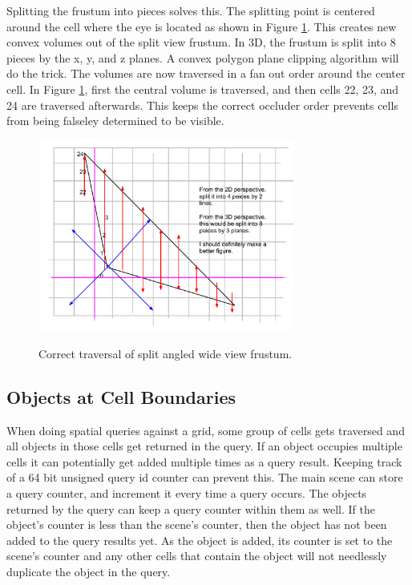 \documentclass[12pt]{ucthesis}
\newcommand{\captionfonts}{\small\bf\ssp}
\begin{document}
Splitting the frustum into pieces solves this.
The splitting point is centered around the cell where the eye is located as shown in Figure \ref{fig:correct-wide-frustum-iter}.
This creates new convex volumes out of the split view frustum.
In 3D, the frustum is split into 8 pieces by the x, y, and z planes.
A convex polygon plane clipping algorithm will do the trick.
The volumes are now traversed in a fan out order around the center cell.
In Figure \ref{fig:correct-wide-frustum-iter}, first the central volume is traversed, and then cells 22, 23, and 24 are traversed afterwards.
This keeps the correct occluder order prevents cells from being falseley determined to be visible.

\begin{figure}
\begin{center}
\includegraphics[width=0.75\textwidth]{Images/wide-traversal.pdf}
\captionfonts
\caption[Correct Wide View Frustum]{Correct traversal of split angled wide view frustum.}
\label{fig:correct-wide-frustum-iter}
\end{center}
\end{figure}

\subsection{Objects at Cell Boundaries}
\label{objects-at-cell-boundaries}
When doing spatial queries against a grid, some group of cells gets traversed and all objects in those cells get returned in the query.
If an object occupies multiple cells it can potentially get added multiple times as a query result.
Keeping track of a 64 bit unsigned query id counter can prevent this.
The main scene can store a query counter, and increment it every time a query occurs.
The objects returned by the query can keep a query counter within them as well.
If the object's counter is less than the scene's counter, then the object has not been added to the query results yet.
As the object is added, its counter is set to the scene's counter and any other cells that contain the object will not needlessly duplicate the object in the query.
\end{document}
